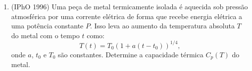\begin{enumerate}
    \item 
        (IPhO 1996) Uma peça de metal termicamente isolada é aquecida sob
        pressão atmosférica por uma corrente elétrica de forma que recebe
        energia elétrica a uma potência constante $P$. Isso leva ao aumento da
        temperatura absoluta $T$ do metal com o tempo $t$ como:
        $$T(t)=T_0\left(1+a\left(t-t_0\right)\right)^{1/4},$$
        onde $a$, $t_0$ e $T_0$ são constantes. Determine a capacidade térmica
        $C_p(T)$ do metal.
\end{enumerate}
